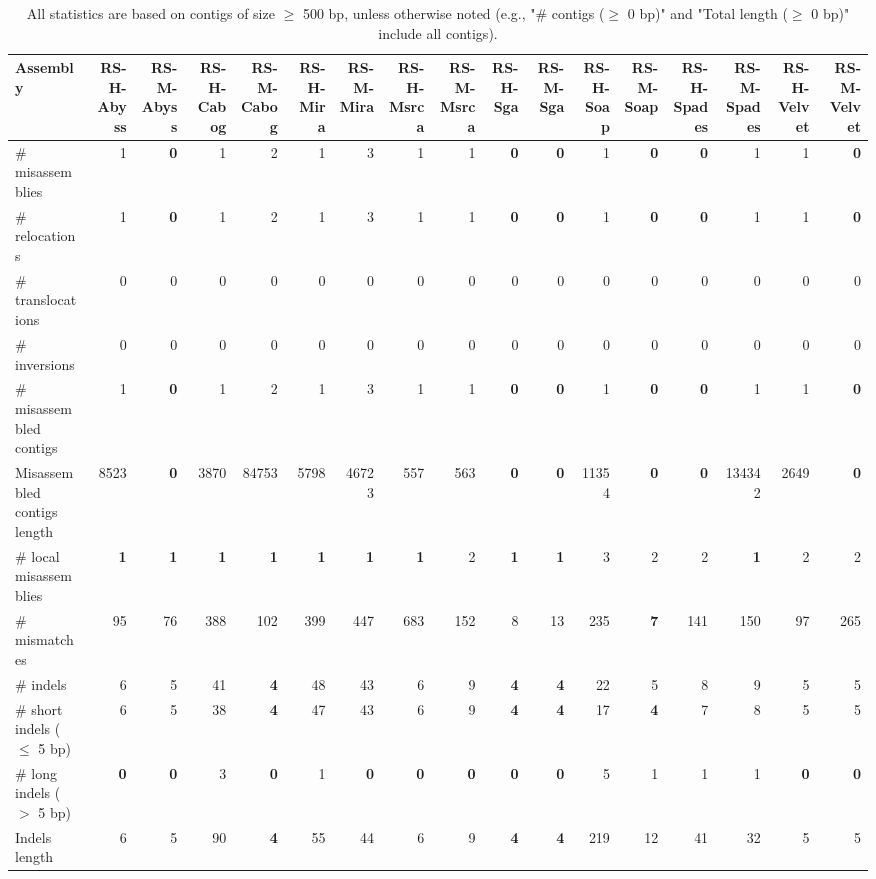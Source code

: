 \documentclass[12pt,a4paper]{article}
\begin{document}
\begin{table}[ht]
\begin{center}
\caption{All statistics are based on contigs of size $\geq$ 500 bp, unless otherwise noted (e.g., "\# contigs ($\geq$ 0 bp)" and "Total length ($\geq$ 0 bp)" include all contigs).}
\begin{tabular}{|l*{16}{|r}|}
\hline
Assembly & RS-H-Abyss & RS-M-Abyss & RS-H-Cabog & RS-M-Cabog & RS-H-Mira & RS-M-Mira & RS-H-Msrca & RS-M-Msrca & RS-H-Sga & RS-M-Sga & RS-H-Soap & RS-M-Soap & RS-H-Spades & RS-M-Spades & RS-H-Velvet & RS-M-Velvet \\ \hline
\# misassemblies & 1 & {\bf 0} & 1 & 2 & 1 & 3 & 1 & 1 & {\bf 0} & {\bf 0} & 1 & {\bf 0} & {\bf 0} & 1 & 1 & {\bf 0} \\ \hline
\hspace{5mm}\# relocations & 1 & {\bf 0} & 1 & 2 & 1 & 3 & 1 & 1 & {\bf 0} & {\bf 0} & 1 & {\bf 0} & {\bf 0} & 1 & 1 & {\bf 0} \\ \hline
\hspace{5mm}\# translocations & 0 & 0 & 0 & 0 & 0 & 0 & 0 & 0 & 0 & 0 & 0 & 0 & 0 & 0 & 0 & 0 \\ \hline
\hspace{5mm}\# inversions & 0 & 0 & 0 & 0 & 0 & 0 & 0 & 0 & 0 & 0 & 0 & 0 & 0 & 0 & 0 & 0 \\ \hline
\# misassembled contigs & 1 & {\bf 0} & 1 & 2 & 1 & 3 & 1 & 1 & {\bf 0} & {\bf 0} & 1 & {\bf 0} & {\bf 0} & 1 & 1 & {\bf 0} \\ \hline
Misassembled contigs length & 8523 & {\bf 0} & 3870 & 84753 & 5798 & 46723 & 557 & 563 & {\bf 0} & {\bf 0} & 11354 & {\bf 0} & {\bf 0} & 134342 & 2649 & {\bf 0} \\ \hline
\# local misassemblies & {\bf 1} & {\bf 1} & {\bf 1} & {\bf 1} & {\bf 1} & {\bf 1} & {\bf 1} & 2 & {\bf 1} & {\bf 1} & 3 & 2 & 2 & {\bf 1} & 2 & 2 \\ \hline
\# mismatches & 95 & 76 & 388 & 102 & 399 & 447 & 683 & 152 & 8 & 13 & 235 & {\bf 7} & 141 & 150 & 97 & 265 \\ \hline
\# indels & 6 & 5 & 41 & {\bf 4} & 48 & 43 & 6 & 9 & {\bf 4} & {\bf 4} & 22 & 5 & 8 & 9 & 5 & 5 \\ \hline
\hspace{5mm}\# short indels ($\leq$ 5 bp) & 6 & 5 & 38 & {\bf 4} & 47 & 43 & 6 & 9 & {\bf 4} & {\bf 4} & 17 & {\bf 4} & 7 & 8 & 5 & 5 \\ \hline
\hspace{5mm}\# long indels ($>$ 5 bp) & {\bf 0} & {\bf 0} & 3 & {\bf 0} & 1 & {\bf 0} & {\bf 0} & {\bf 0} & {\bf 0} & {\bf 0} & 5 & 1 & 1 & 1 & {\bf 0} & {\bf 0} \\ \hline
Indels length & 6 & 5 & 90 & {\bf 4} & 55 & 44 & 6 & 9 & {\bf 4} & {\bf 4} & 219 & 12 & 41 & 32 & 5 & 5 \\ \hline
\end{tabular}
\end{center}
\end{table}
\end{document}
